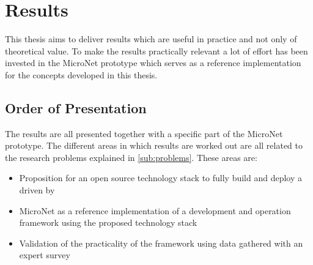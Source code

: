 \chapter{Results}

This thesis aims to deliver results which are useful in practice and not only
of theoretical value. To make the results practically relevant a lot of effort
has been invested in the MicroNet prototype which serves as a reference
implementation for the concepts developed in this thesis.

\section{Order of Presentation}

The results are all presented together with a specific part of the MicroNet
prototype. The different areas in which results are worked out are all related
to the research problems explained in \autoref{sub:problems}. These areas are:

\begin{itemize}
  \item Proposition for an  open source technology stack to fully build and
  deploy a \og{} driven by \mss{}
  \item MicroNet as a reference implementation of a \ms{} \og{} development and
  operation framework using the proposed technology stack
  \item Validation of the practicality of the framework using data gathered with
  an expert survey 
\end{itemize}



\newpage
